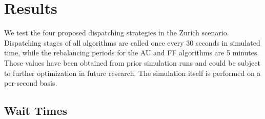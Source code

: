 \section{Results}
\label{sec:results}

We test the four proposed dispatching strategies in the Zurich scenario.  Dispatching stages of all algorithms are called once every 30 seconds in simulated time, while the rebalancing periods for the AU and FF algorithms are 5 minutes. Those values have been obtained from prior simulation runs and could be subject to further optimization in future research. The simulation itself is performed on a per-second basis.


\subsection{Wait Times}
\label{sec:cost_analysis}

